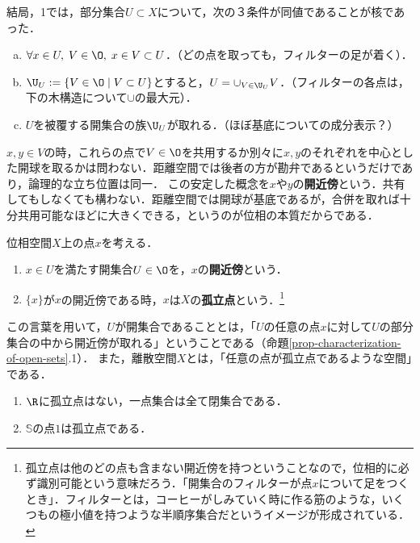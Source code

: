\documentclass[uplatex,dvipdfmx]{jsreport}
\begin{document}
\begin{remarks}
    結局，1では，部分集合$U\subset X$について，次の３条件が同値であることが核であった．
    \begin{enumerate}[(a)]
        \item $\forall x\in U,\;V\in\O,\;x\in V\subset U$．（どの点を取っても，フィルターの足が着く）．
        \item $\U_U:=\{V\in\O\mid V\subset U\}$とすると，$U=\cup_{V\in\U_U}V$．（フィルターの各点は，下の木構造について$\cup$の最大元）．
        \item $U$を被覆する開集合の族$\U_U$が取れる．（ほぼ基底についての成分表示？）
    \end{enumerate}
    $x,y\in V$の時，これらの点で$V\in\O$を共用するか別々に$x,y$のそれぞれを中心とした開球を取るかは問わない．距離空間では後者の方が勘弁であるというだけであり，論理的な立ち位置は同一．
    この安定した概念を$x$や$y$の\textbf{開近傍}という．共有してもしなくても構わない．距離空間では開球が基底であるが，合併を取れば十分共用可能なほどに大きくできる，というのが位相の本質だからである．
\end{remarks}

\begin{definition}
    位相空間$X$上の点$x$を考える．
    \begin{enumerate}
        \item $x\in U$を満たす開集合$U\in\O$を，$x$の\textbf{開近傍}という．
        \item $\{x\}$が$x$の開近傍である時，$x$は$X$の\textbf{孤立点}という．\footnote{孤立点は他のどの点も含まない開近傍を持つということなので，位相的に必ず識別可能という意味だろう．「開集合のフィルターが点$x$について足をつくとき」．フィルターとは，コーヒーがしみていく時に作る筋のような，いくつもの極小値を持つような半順序集合だというイメージが形成されている．}
    \end{enumerate}
\end{definition}
\begin{remark}
    この言葉を用いて，$U$が開集合であることとは，「$U$の任意の点$x$に対して$U$の部分集合の中から開近傍が取れる」ということである（命題\ref{prop-characterization-of-open-sets}.1）．
    また，離散空間$X$とは，「任意の点が孤立点であるような空間」である．
\end{remark}
\begin{example}\mbox{}
    \begin{enumerate}
    \item $\R$に孤立点はない，一点集合は全て閉集合である．
    \item $\mathbb{S}$の点$1$は孤立点である．
\end{enumerate}
\end{example}
\end{document}
